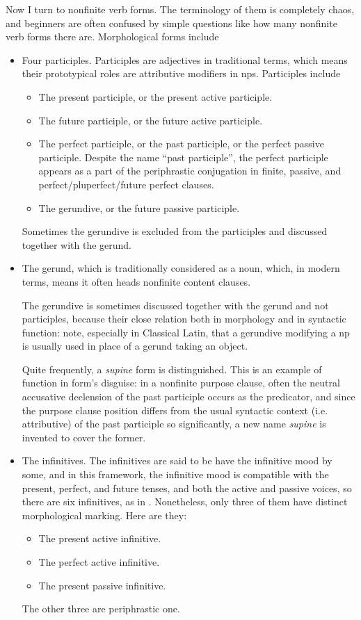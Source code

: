 \documentclass{article}
\newcommand*{\term}[1]{\emph{#1}}
\begin{document}
Now I turn to nonfinite verb forms.
The terminology of them is completely chaos, 
and beginners are often confused by simple questions like how many nonfinite verb forms there are.
Morphological forms include 
\begin{itemize}
    \item Four participles. Participles are adjectives in traditional terms,
    which means their prototypical roles are attributive modifiers in \ac{np}s.
    Participles include 
    \begin{itemize}
        \item The present participle, or the present active participle.
        \item The future participle, or the future active participle.
        \item The perfect participle, or the past participle, or the perfect passive participle.
        Despite the name ``past participle'', the perfect participle appears 
        as a part of the periphrastic conjugation
        in finite, passive, and perfect/pluperfect/future perfect clauses.
        \item The gerundive, or the future passive participle.
    \end{itemize}
    Sometimes the gerundive is excluded from the participles and discussed together with the gerund.
    \item The gerund, which is traditionally considered as a noun,
    which, in modern terms, means it often heads nonfinite content clauses.

    The gerundive is sometimes discussed together with the gerund and not participles,
    because their close relation both in morphology and in syntactic function:
    note, especially in Classical Latin, that 
    a gerundive modifying a \ac{np} is usually used in place of 
    a gerund taking an object.

    Quite frequently, a \term{supine} form is distinguished.
    This is an example of function in form's disguise: 
    in a nonfinite purpose clause,
    often the neutral accusative declension of the past participle occurs as the predicator,
    and since the purpose clause position differs 
    from the usual syntactic context (i.e. attributive) of the past participle
    so significantly,
    a new name \term{supine} is invented to cover the former.
    \item The infinitives. The infinitives are said to be have the infinitive mood by some,
    and in this framework, the infinitive mood is compatible with the 
    present, perfect, and future tenses,
    and both the active and passive voices,
    so there are six infinitives, as in .
    Nonetheless, only three of them have distinct morphological marking. 
    Here are they:
    \begin{itemize}
        \item The present active infinitive.
        \item The perfect active infinitive.
        \item The present passive infinitive.
    \end{itemize}
    The other three are periphrastic one.


\end{itemize}
\end{document}

